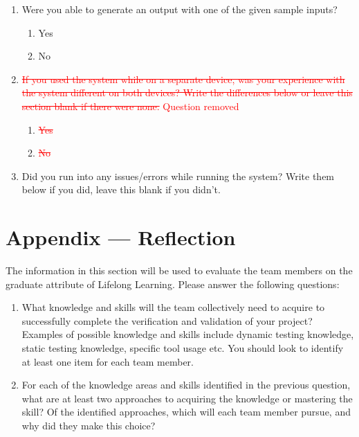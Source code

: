 \documentclass[12pt, titlepage]{article}
\begin{document}
\begin{enumerate}
\item Were you able to generate an output with one of the given sample inputs?
   \begin{enumerate}
     \item Yes
     \item No
   \end{enumerate}
  
\item \textcolor{red}{\sout{If you used the system while on a separate device, was your experience with the system different on both devices? Write the differences below or leave this section blank if there were none.} Question removed}
   \begin{enumerate}
     \item \textcolor{red}{\sout{Yes}}
     \item \textcolor{red}{\sout{No}}
   \end{enumerate}

\item Did you run into any issues/errors while running the system? Write them below if you did, leave this blank if you didn't.




   
\end{enumerate}




\newpage{}
\section*{Appendix --- Reflection}

The information in this section will be used to evaluate the team members on the
graduate attribute of Lifelong Learning.  Please answer the following questions:

\begin{enumerate}
  \item What knowledge and skills will the team collectively need to acquire to
  successfully complete the verification and validation of your project?
  Examples of possible knowledge and skills include dynamic testing knowledge,
  static testing knowledge, specific tool usage etc.  You should look to
  identify at least one item for each team member.
  \item For each of the knowledge areas and skills identified in the previous
  question, what are at least two approaches to acquiring the knowledge or
  mastering the skill?  Of the identified approaches, which will each team
  member pursue, and why did they make this choice?
\end{enumerate}
\end{document}
